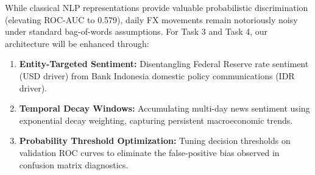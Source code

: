 \documentclass[10pt,a4paper]{article}
\begin{document}
While classical NLP representations provide valuable probabilistic discrimination (elevating ROC-AUC to 0.579), daily FX movements remain notoriously noisy under standard bag-of-words assumptions. For Task 3 and Task 4, our architecture will be enhanced through:
\begin{enumerate}[leftmargin=1.5em,nosep]
    \item \textbf{Entity-Targeted Sentiment:} Disentangling Federal Reserve rate sentiment (USD driver) from Bank Indonesia domestic policy communications (IDR driver).
    \item \textbf{Temporal Decay Windows:} Accumulating multi-day news sentiment using exponential decay weighting, capturing persistent macroeconomic trends.
    \item \textbf{Probability Threshold Optimization:} Tuning decision thresholds on validation ROC curves to eliminate the false-positive bias observed in confusion matrix diagnostics.
\end{enumerate}
\end{document}
